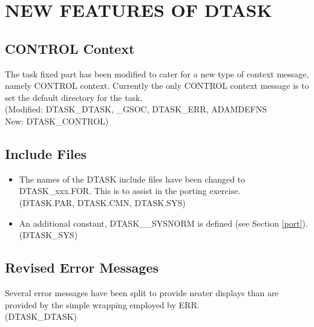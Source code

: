\section{NEW FEATURES OF DTASK}
\label{dtask}
\subsection{CONTROL Context}
The task fixed part has been modified to cater for a new type of context
message, namely CONTROL context. Currently the only CONTROL context message
is to set the default directory for the task.\\
(Modified: DTASK\_DTASK, \_GSOC, DTASK\_ERR, ADAMDEFNS\\
New: DTASK\_CONTROL)

\subsection{Include Files}
\begin{itemize}
\item The names of the DTASK include files have been changed to DTASK\_xxx.FOR.
This is to assist in the porting exercise.\\
(DTASK.PAR, DTASK.CMN, DTASK.SYS)
\item An additional constant, DTASK\_\_SYSNORM is defined (see Section
\ref{port}).\\
(DTASK\_SYS)
\end{itemize}

\subsection{Revised Error Messages}
Several error messages have been split to provide neater displays than are
provided by the simple wrapping employed by ERR.\\
(DTASK\_DTASK)


